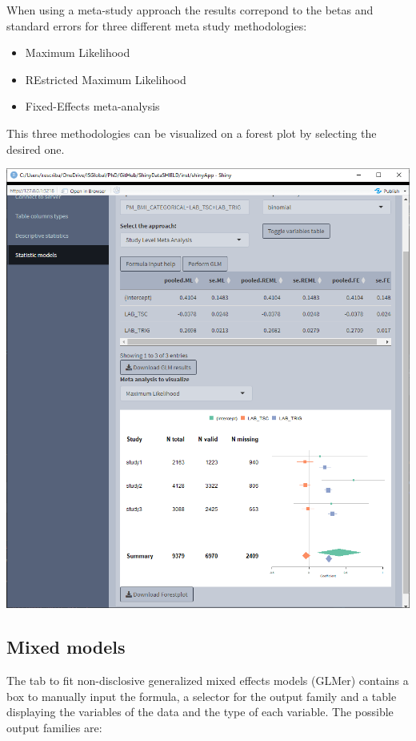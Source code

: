 \documentclass[
]{book}
\providecommand{\tightlist}{%
  \setlength{\itemsep}{0pt}\setlength{\parskip}{0pt}}
\begin{document}
When using a meta-study approach the results correpond to the betas and standard errors for three different meta study methodologies:

\begin{itemize}
\tightlist
\item
  Maximum Likelihood
\item
  REstricted Maximum Likelihood
\item
  Fixed-Effects meta-analysis
\end{itemize}

This three methodologies can be visualized on a forest plot by selecting the desired one.

\includegraphics{images/stat_models1_2.png}

\hypertarget{mixed-models}{%
\subsection{Mixed models}\label{mixed-models}}

The tab to fit non-disclosive generalized mixed effects models (GLMer) contains a box to manually input the formula, a selector for the output family and a table displaying the variables of the data and the type of each variable. The possible output families are:
\end{document}
